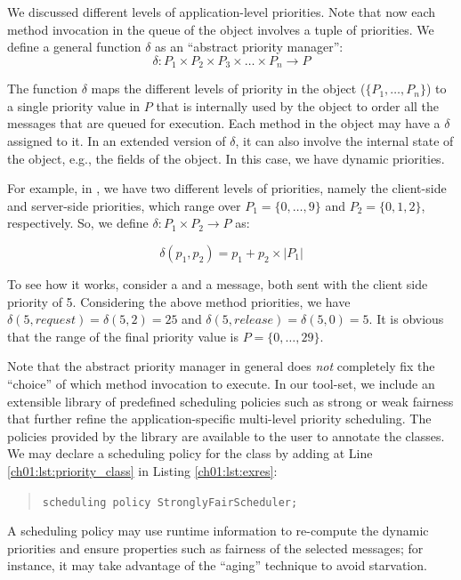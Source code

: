 We discussed different levels of application-level priorities. 
Note that now each method invocation in
the queue of the object involves a tuple of priorities.
We define a general function $\delta$ as an ``abstract priority manager'':
%
\[ \delta : P_1 \times P_2 \times P_3 \times \ldots \times P_n \longrightarrow  P \]

The function $\delta$ maps the different levels of priority in the object
($\{P_1,\ldots,P_n\}$) to a single priority value in $P$ that is internally used by the
object to order all the messages that are queued for execution. Each
method in the object may have a $\delta$ assigned to it. In an extended
version of $\delta$, it can also involve the internal state of the object,
e.g., the fields of the object. 
In this case, we have dynamic priorities.

For example, in {}, we have two different levels of priorities, namely  the client-side and server-side priorities, which range over $P_1 = \{0, \ldots, 9\}$ and $P_2 = \{0, 1, 2\}$, respectively. 
So, we define $\delta: P_1 \times P_2 \rightarrow P$ as:

\[
\delta(p_1, p_2) = p_1 + p_2 \times |P_1|
\]

To see how it works, consider a  and a  message, both sent with the client side priority of 5. 
Considering the above method priorities, we have $\delta(5, request) = \delta(5,2) = 25$ and  $\delta(5, release) = \delta(5,0) = 5$.
It is obvious that the range of the final priority value is $P = \{0,\ldots,29\}$.

Note that the abstract priority manager in general does \textit{not} completely
fix the ``choice'' of which method invocation to execute. 
In our tool-set, we include an extensible library of predefined scheduling policies such as strong or weak fairness that further refine the application-specific multi-level priority scheduling. 
The policies provided by the library are available to the user to annotate the classes.
We may declare a scheduling policy for the  class by adding at Line
\ref{ch01:lst:priority_class} in Listing \ref{ch01:lst:exres}: 
%
\begin{quote}
\lstinline{scheduling policy StronglyFairScheduler;} 
\end{quote} 

A scheduling policy may
use runtime information to re-compute the dynamic priorities and ensure
properties such as fairness of the selected messages; for instance, it may
take advantage of the ``aging'' technique to avoid starvation. 

